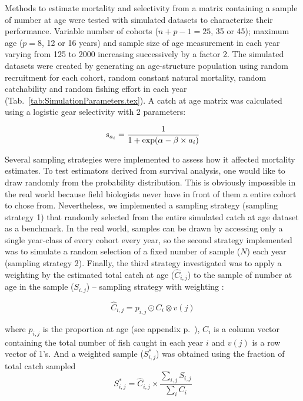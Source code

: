 Methods to estimate mortality and selectivity from a matrix containing a sample of number at age were tested with simulated datasets to characterize their performance. Variable number of cohorts ($n+p-1 = 25$, 35 or 45); maximum age ($p=8$, 12 or 16 years) and sample size of age measurement in each year varying from 125 to 2000 increasing successively by a factor 2. The simulated datasets were created by generating an age-structure population using random recruitment for each cohort, random constant natural mortality, random catchability and random fishing effort in each year (Tab.~\ref{tab:SimulationParameters.tex}). A catch at age matrix was calculated using a logistic gear selectivity with 2 parameters: 

\begin{equation}
s_{a_{i}} = \frac{1}{1  + {\rm exp}( \alpha - \beta \times a_{i})}
\end{equation}

Several sampling strategies were implemented to assess how it affected mortality estimates. To test estimators derived from survival analysis, one would like to draw randomly from the probability distribution. This is obviously impossible in the real world because field biologists never have in front of them a entire cohort to chose from. Nevertheless, we implemented a sampling strategy (sampling strategy 1) that randomly selected from the entire simulated catch at age dataset as a benchmark. In the real world, samples can be drawn by accessing only a single year-class of every cohort every year, so the second strategy implemented was to simulate a random selection of a fixed number of sample ($N$) each year (sampling strategy 2). Finally, the third strategy investigated was to apply a weighting by the estimated total catch at age ($\hat{C}_{i,j}$) to the sample of number at age in the sample ($S_{i,j}$) -- sampling strategy with weighting :

\begin{equation}
\hat{C}_{i,j} = p_{i,j} \odot C_{i} \otimes v(j)
\end{equation}

\noindent where $p_{i,j}$ is the proportion at age (see appendix p.~\pageref{Appendix:DefinitionsOfMathematicalSymbols}), $C_{i}$ is a column vector containing the total number of fish caught in each year $i$ and $v(j)$ is a row vector of 1's. 
And a weighted sample ($S^{*}_{i,j}$) was obtained using the fraction of total catch sampled
\begin{equation}
S^{*}_{i,j} = \hat{C}_{i,j} \times \frac{\sum_{i,j} S_{i,j}}{\sum_{i} C_{i}}
\end{equation}


